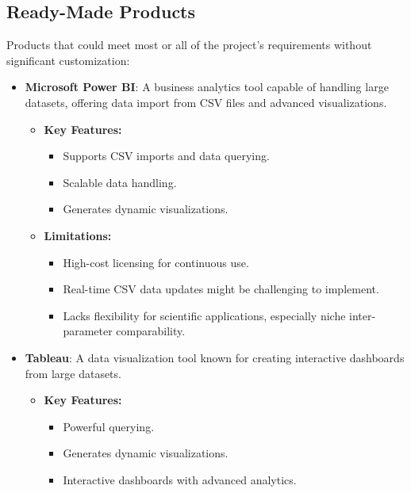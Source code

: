 \documentclass[12pt]{article}
\begin{document}
\subsection{Ready-Made Products}

Products that could meet most or all of the project’s requirements without
significant customization:

\begin{itemize}
    \item \textbf{Microsoft Power BI}: A business analytics tool capable of
    handling large datasets, offering data import from CSV files and advanced
    visualizations.
    
    \begin{itemize}
        \item \textbf{Key Features:}
        \begin{itemize}
            \item Supports CSV imports and data querying.
            \item Scalable data handling.
            \item Generates dynamic visualizations.
        \end{itemize}

        \item \textbf{Limitations:}
        \begin{itemize}
            \item High-cost licensing for continuous use.
            \item Real-time CSV data updates might be challenging to implement.
            \item Lacks flexibility for scientific applications, especially
            niche inter-parameter comparability.
        \end{itemize}
    \end{itemize}

    \item \textbf{Tableau}: A data visualization tool known for creating
    interactive dashboards from large datasets.
    
    \begin{itemize}
        \item \textbf{Key Features:}
        \begin{itemize}
            \item Powerful querying.
            \item Generates dynamic visualizations.
            \item Interactive dashboards with advanced analytics.
        \end{itemize}


\end{itemize}
\end{itemize}
\end{document}
